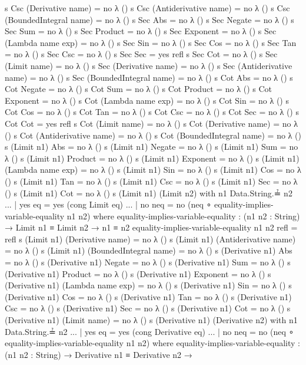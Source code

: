 \documentclass{report}
\begin{document}
\begin{code}
  s Csc (Derivative name) = no λ ()
  s Csc (Antiderivative name) = no λ ()
  s Csc (BoundedIntegral name) = no λ ()
  s Sec Abs = no λ ()
  s Sec Negate = no λ ()
  s Sec Sum = no λ ()
  s Sec Product = no λ ()
  s Sec Exponent = no λ ()
  s Sec (Lambda name exp) = no λ ()
  s Sec Sin = no λ ()
  s Sec Cos = no λ ()
  s Sec Tan = no λ ()
  s Sec Csc = no λ ()
  s Sec Sec = yes refl
  s Sec Cot = no λ ()
  s Sec (Limit name) = no λ ()
  s Sec (Derivative name) = no λ ()
  s Sec (Antiderivative name) = no λ ()
  s Sec (BoundedIntegral name) = no λ ()
  s Cot Abs = no λ ()
  s Cot Negate = no λ ()
  s Cot Sum = no λ ()
  s Cot Product = no λ ()
  s Cot Exponent = no λ ()
  s Cot (Lambda name exp) = no λ ()
  s Cot Sin = no λ ()
  s Cot Cos = no λ ()
  s Cot Tan = no λ ()
  s Cot Csc = no λ ()
  s Cot Sec = no λ ()
  s Cot Cot = yes refl
  s Cot (Limit name) = no λ ()
  s Cot (Derivative name) = no λ ()
  s Cot (Antiderivative name) = no λ ()
  s Cot (BoundedIntegral name) = no λ ()
  s (Limit n1) Abs = no λ ()
  s (Limit n1) Negate = no λ ()
  s (Limit n1) Sum = no λ ()
  s (Limit n1) Product = no λ ()
  s (Limit n1) Exponent = no λ ()
  s (Limit n1) (Lambda name exp) = no λ ()
  s (Limit n1) Sin = no λ ()
  s (Limit n1) Cos = no λ ()
  s (Limit n1) Tan = no λ ()
  s (Limit n1) Csc = no λ ()
  s (Limit n1) Sec = no λ ()
  s (Limit n1) Cot = no λ ()
  s (Limit n1) (Limit n2) with n1 Data.String.≟ n2
  ... | yes eq = yes (cong Limit eq)
  ... | no neq = no (neq ∘ equality-implies-variable-equality n1 n2)
    where
    equality-implies-variable-equality : (n1 n2 : String) →
           Limit n1 ≡ Limit n2 →
           n1 ≡ n2
    equality-implies-variable-equality n1 n2 refl = refl
  s (Limit n1) (Derivative name) = no λ ()
  s (Limit n1) (Antiderivative name) = no λ ()
  s (Limit n1) (BoundedIntegral name) = no λ ()
  s (Derivative n1) Abs = no λ ()
  s (Derivative n1) Negate = no λ ()
  s (Derivative n1) Sum = no λ ()
  s (Derivative n1) Product = no λ ()
  s (Derivative n1) Exponent = no λ ()
  s (Derivative n1) (Lambda name exp) = no λ ()
  s (Derivative n1) Sin = no λ ()
  s (Derivative n1) Cos = no λ ()
  s (Derivative n1) Tan = no λ ()
  s (Derivative n1) Csc = no λ ()
  s (Derivative n1) Sec = no λ ()
  s (Derivative n1) Cot = no λ ()
  s (Derivative n1) (Limit name) = no λ ()
  s (Derivative n1) (Derivative n2) with n1 Data.String.≟ n2
  ... | yes eq = yes (cong Derivative eq)
  ... | no neq = no (neq ∘ equality-implies-variable-equality n1 n2)
    where
    equality-implies-variable-equality : (n1 n2 : String) →
           Derivative n1 ≡ Derivative n2 →

\end{code}
\end{document}
